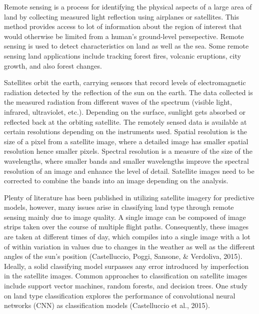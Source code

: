 \documentclass[12pt,twoside]{reedthesis}
\begin{document}
Remote sensing is a process for identifying the physical aspects of a large area of land by collecting measured light reflection using airplanes or satellites. This method provides access to lot of information about the region of interest that would otherwise be limited from a human's ground-level persepective. Remote sensing is used to detect characteristics on land as well as the sea. Some remote sensing land applications include tracking forest fires, volcanic eruptions, city growth, and also forest changes.

Satellites orbit the earth, carrying sensors that record levels of electromagnetic radiation detected by the reflection of the sun on the earth. The data collected is the measured radiation from different waves of the spectrum (visible light, infrared, ultraviolet, etc.). Depending on the surface, sunlight gets absorbed or reflected back at the orbiting satellite. The remotely sensed data is available at certain resolutions depending on the instruments used. Spatial resolution is the size of a pixel from a satellite image, where a detailed image has smaller spatial resolution hence smaller pixels. Spectral resolution is a measure of the size of the wavelengths, where smaller bands and smaller wavelengths improve the spectral resolution of an image and enhance the level of detail. Satellite images need to be corrected to combine the bands into an image depending on the analysis.

Plenty of literature has been published in utilizing satellite imagery for predictive models, however, many issues arise in classifying land type through remote sensing mainly due to image quality. A single image can be composed of image strips taken over the course of multiple flight paths. Consequently, these images are taken at different times of day, which compiles into a single image with a lot of within variation in values due to changes in the weather as well as the different angles of the sun's position (Castelluccio, Poggi, Sansone, \& Verdoliva, 2015). Ideally, a solid classifying model surpasses any error introduced by imperfection in the satellite images. Common approaches to classification on satellite images include support vector machines, random forests, and decision trees. One study on land type classification explores the performance of convolutional neural networks (CNN) as classification models (Castelluccio et al., 2015).
\end{document}
